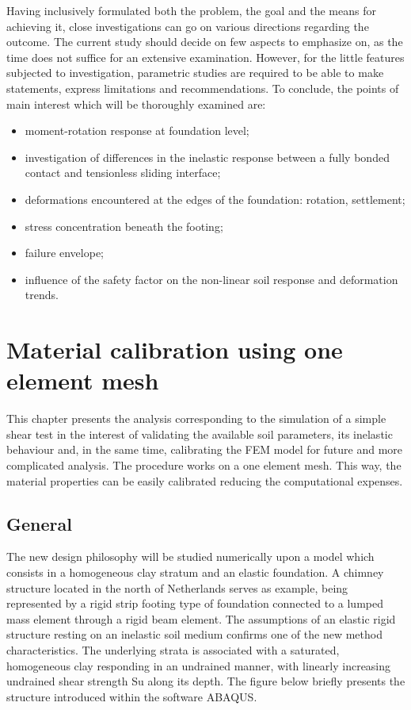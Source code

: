 \documentclass[12pt,a4paper]{report}
\begin{document}
Having inclusively formulated both the problem, the goal and the means for achieving it, close investigations can go on various directions regarding the outcome. The current study should decide on few aspects to emphasize on, as the time does not suffice for an extensive examination. However, for the little features subjected to investigation, parametric studies are required to be able to make statements, express limitations and recommendations. To conclude, the points of main interest which will be thoroughly examined are:
\begin{itemize}
	\item moment-rotation response at foundation level;
	\item investigation of differences in the inelastic response between a fully bonded contact and tensionless sliding interface;
	\item deformations encountered at the edges of the foundation: rotation, settlement;
	\item stress concentration beneath the footing;
	\item failure envelope;
	\item influence of the safety factor on the non-linear soil response and deformation trends.
\end{itemize} 

\chapter{Material calibration using one element mesh}\label{ch3}
This chapter presents the analysis corresponding to the simulation of a simple shear test in the interest of validating the available soil parameters, its inelastic behaviour and, in the same time, calibrating the FEM model for future and more complicated analysis. The procedure works on a one element mesh. This way, the material properties can be easily calibrated reducing the computational expenses. 

\section{General}
The new design philosophy will be studied numerically upon a model which consists in a homogeneous clay stratum and an elastic foundation.  A chimney structure located in the north of Netherlands serves as example, being represented by a rigid strip footing type of foundation connected to a lumped mass element through a rigid beam element. The assumptions of an elastic rigid structure resting on an inelastic soil medium confirms one of the new method characteristics. The underlying strata is associated with a saturated, homogeneous clay responding in an undrained manner, with linearly increasing undrained shear strength Su along its depth. The figure below briefly presents the structure introduced within the software ABAQUS.
\end{document}
